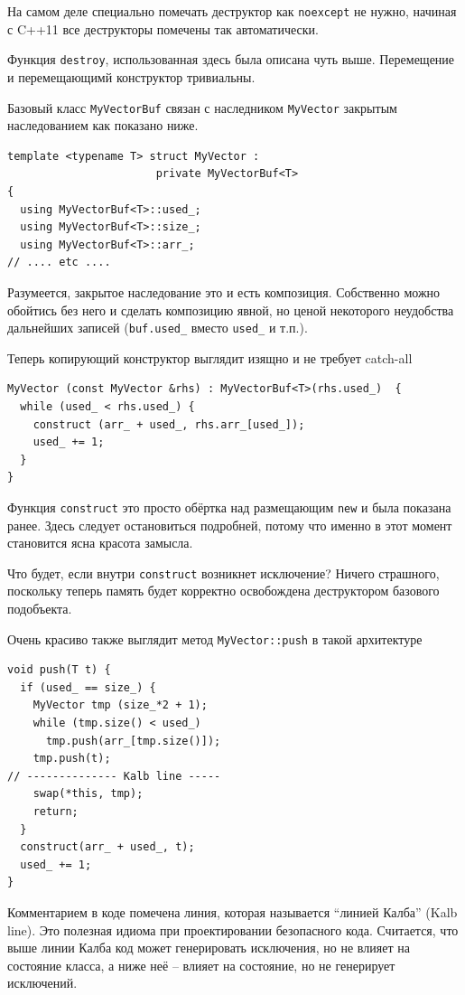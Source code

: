 \documentclass[a4paper,12pt,oneside]{book}
\begin{document}
На самом деле специально помечать деструктор как \lstinline!noexcept! не нужно, начиная с C++11 все деструкторы помечены так автоматически.

Функция \lstinline!destroy!, использованная здесь была описана чуть выше. Перемещение и перемещающимй конструктор тривиальны.

Базовый класс \lstinline!MyVectorBuf! связан с наследником \lstinline!MyVector! закрытым наследованием как показано ниже.

\begin{lstlisting}
template <typename T> struct MyVector : 
                       private MyVectorBuf<T> 
{
  using MyVectorBuf<T>::used_;
  using MyVectorBuf<T>::size_;
  using MyVectorBuf<T>::arr_;
// .... etc ....
\end{lstlisting}

Разумеется, закрытое наследование это и есть композиция. Собственно можно обойтись без него и сделать композицию явной, но ценой некоторого неудобства дальнейших записей (\lstinline!buf.used_! вместо \lstinline!used_! и т.п.).

Теперь копирующий конструктор выглядит изящно и не требует catch-all

\begin{lstlisting}
MyVector (const MyVector &rhs) : MyVectorBuf<T>(rhs.used_)  {
  while (used_ < rhs.used_) {
    construct (arr_ + used_, rhs.arr_[used_]);
    used_ += 1;
  }
}
\end{lstlisting}

Функция \lstinline!construct! это просто обёртка над размещающим \lstinline!new! и была показана ранее. Здесь следует остановиться подробней, потому что именно в этот момент становится ясна красота замысла.

Что будет, если внутри \lstinline!construct! возникнет исключение? Ничего страшного, поскольку теперь память будет корректно освобождена деструктором базового подобъекта.

Очень красиво также выглядит метод \lstinline!MyVector::push! в такой архитектуре

\begin{lstlisting}
void push(T t) {
  if (used_ == size_) {
    MyVector tmp (size_*2 + 1);
    while (tmp.size() < used_)
      tmp.push(arr_[tmp.size()]);
    tmp.push(t);
// -------------- Kalb line -----
    swap(*this, tmp);
    return;
  }
  construct(arr_ + used_, t);
  used_ += 1;
}
\end{lstlisting}

Комментарием в коде помечена линия, которая называется ``линией Калба'' (Kalb line). Это полезная идиома при проектировании безопасного кода. Считается, что выше линии Калба код может генерировать исключения, но не влияет на состояние класса, а ниже неё -- влияет на состояние, но не генерирует исключений.
\end{document}
